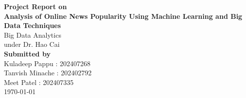 \begin{titlepage}
    \centering
    \vspace*{2cm}

    {\Huge \textbf{Project Report on}}\\[0.5cm]
    {\LARGE \textbf{Analysis of Online News Popularity Using Machine Learning and Big Data Techniques}}\\[1.5cm]

    {\Large Big Data Analytics}\\[0.3cm]
    {\large under Dr. Hao Cai}\\[2cm]

    \textbf{Submitted by}\\[0.5cm]
    Kuladeep Pappu : 202407268\\
    Tanvish Minache : 202402792\\
    Meet Patel : 202407335\\[2cm]

    \vfill
    {\large \today}
\end{titlepage}
